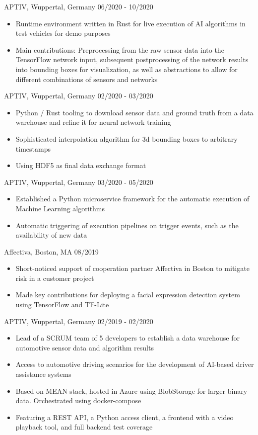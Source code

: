 \documentclass[singlesided,
               paper=a4,
               fontsize=10pt
              ]{my-resume}
\begin{document}
%
    {APTIV, Wuppertal, Germany}
    {06/2020 - 10/2020}
    {\begin{itemize}[leftmargin=2em]
        \item Runtime environment written in Rust for live execution of AI algorithms in test vehicles for demo purposes
        \item Main contributions: Preprocessing from the raw sensor data into the TensorFlow network input, subsequent postprocessing of the network results into bounding boxes for visualization, as well as abstractions to allow for different combinations of sensors and networks
    \end{itemize}}
%
    {APTIV, Wuppertal, Germany}
    {02/2020 - 03/2020}
    {\begin{itemize}[leftmargin=2em]
        \item Python / Rust tooling to download sensor data and ground truth from a data warehouse and refine it for neural network training
        \item Sophisticated interpolation algorithm for 3d bounding boxes to arbitrary timestamps
        \item Using HDF5 as final data exchange format
    \end{itemize}}
%
    {APTIV, Wuppertal, Germany}
    {03/2020 - 05/2020}
    {\begin{itemize}[leftmargin=2em]
        \item Established a Python microservice framework for the automatic execution of Machine Learning algorithms
        \item Automatic triggering of execution pipelines on trigger events, such as the availability of new data
    \end{itemize}}
%
    {Affectiva, Boston, MA}
    {08/2019}
    {\begin{itemize}[leftmargin=2em]
        \item Short-noticed support of cooperation partner Affectiva in Boston to mitigate risk in a customer project
        \item Made key contributions for deploying a facial expression detection system using TensorFlow and TF-Lite
    \end{itemize}}
%
    {APTIV, Wuppertal, Germany}
    {02/2019 - 02/2020}
    {\begin{itemize}[leftmargin=2em]
        \item Lead of a SCRUM team of 5 developers to establish a data warehouse for automotive sensor data and algorithm results
        \item Access to automotive driving scenarios for the development of AI-based driver assistance systems
        \item Based on MEAN stack, hosted in Azure using BlobStorage for larger binary data. Orchestrated using docker-compose
        \item Featuring a REST API, a Python access client, a frontend with a video playback tool, and full backend test coverage
    \end{itemize}}
\end{document}
